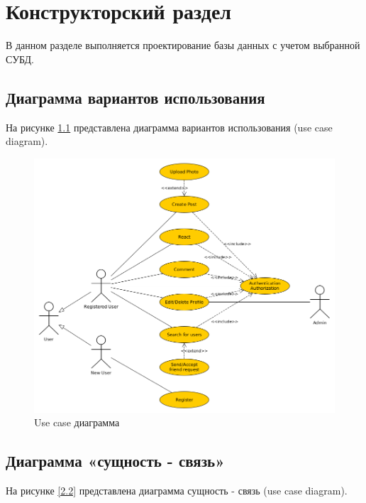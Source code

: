 \chapter{Конструкторский раздел}
\label{cha:design}

В данном разделе выполняется проектирование базы данных с учетом выбранной СУБД.

\section{Диаграмма вариантов использования}

На рисунке \ref{2.1} представлена диаграмма вариантов использования (use case diagram).

\begin{figure}[ht]
  \centering
  \includegraphics[width=\textwidth]{../use_case.png}
  \caption{Use case диаграмма}
  \label{2.1}
\end{figure}


\section{Диаграмма «сущность - связь»}

На рисунке \ref{2.2} представлена диаграмма сущность - связь (use case diagram).

